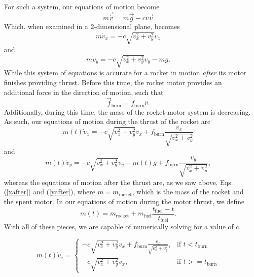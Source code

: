 \documentclass[aps,pra,twocolumn]{revtex4-1}
\begin{document}
For such a system, our equations of motion become \cite{taylor2005}
\begin{equation}
m \vec{\dot{v}} = m \vec{g} - c v \vec{v}
\end{equation}
Which, when examined in a 2-dimensional plane, becomes
\begin{equation}
m \dot{v}_x  = -c\sqrt{v_x^2 + v_y^2}v_x \label{xafter}
\end{equation}
and
\begin{equation}
m \dot{v}_y  = -c\sqrt{v_x^2 + v_y^2}v_y - mg. \label{yafter}
\end{equation}
While this system of equations is accurate for a rocket in motion \emph{after} its motor finishes providing thrust.  Before this time, the rocket motor provides an additional force in the direction of motion, such that
\begin{equation}
\vec{f}_\text{burn} = f_\text{burn} \hat{v}.
\end{equation}
Additionally, during this time, the mass of the rocket-motor system is decreasing.  As such, our equations of motion during the thrust of the rocket are
\begin{equation}
m(t) \dot{v}_x  = -c\sqrt{v_x^2 + v_y^2}v_x + f_\text{burn} \frac{v_x}{\sqrt{v_x^2 + v_y^2}} \label{xbefore}
\end{equation}
and
\begin{equation}
m(t) \dot{v}_y  = -c\sqrt{v_x^2 + v_y^2}v_y - m(t)g + f_\text{burn} \frac{v_y}{\sqrt{v_x^2 + v_y^2}}, \label{ybefore}
\end{equation}
whereas  the equations of motion after the thrust are, as we saw above, Eqs. (\ref{xafter}) and (\ref{yafter}), where $m = m_\text{rocket}$, which is the mass of the rocket and the spent motor.  In our equations of motion during the motor thrust, we define
\begin{equation}
m(t) = m_\text{rocket} + m_\text{fuel} \frac{t_\text{fuel} - t}{t_\text{fuel}}.
\end{equation}
With all of these pieces, we are capable of numerically solving for a value of $c$.

\begin{equation}
m(t) \dot{v}_x = 
\begin{cases}
-c\sqrt{v_x^2 + v_y^2}v_x + f_\text{burn} \frac{v_x}{\sqrt{v_x^2 + v_y^2}}, & \text{if } t < t_\text{burn} \\
-c\sqrt{v_x^2 + v_y^2}v_x, & \text{if } t >= t_\text{burn}
\end{cases}
\end{equation}
\end{document}
